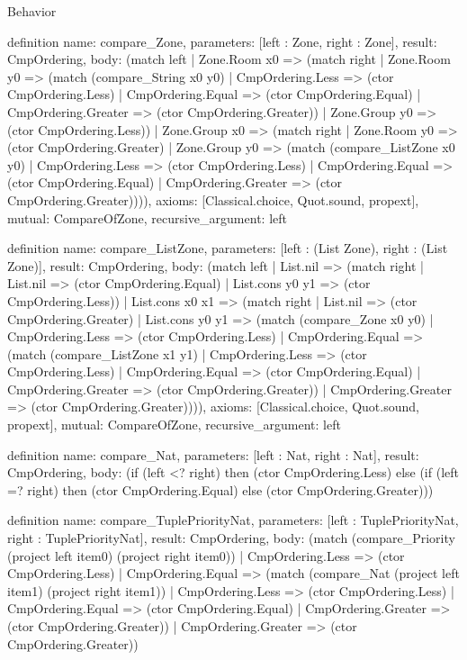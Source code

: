 \begin{lexlean}{Behavior}
\begin{semanticmodule}
definition{
  name: compare_Zone,
  parameters: [left : Zone, right : Zone],
  result: CmpOrdering,
  body: (match left
    | Zone.Room x0 => (match right
      | Zone.Room y0 => (match (compare_String x0 y0)
        | CmpOrdering.Less => (ctor CmpOrdering.Less)
        | CmpOrdering.Equal => (ctor CmpOrdering.Equal)
        | CmpOrdering.Greater => (ctor CmpOrdering.Greater))
      | Zone.Group y0 => (ctor CmpOrdering.Less))
    | Zone.Group x0 => (match right
      | Zone.Room y0 => (ctor CmpOrdering.Greater)
      | Zone.Group y0 => (match (compare_ListZone x0 y0)
        | CmpOrdering.Less => (ctor CmpOrdering.Less)
        | CmpOrdering.Equal => (ctor CmpOrdering.Equal)
        | CmpOrdering.Greater => (ctor CmpOrdering.Greater)))),
  axioms: [Classical.choice, Quot.sound, propext],
  mutual: CompareOfZone,
  recursive_argument: left
}

definition{
  name: compare_ListZone,
  parameters: [left : (List Zone), right : (List Zone)],
  result: CmpOrdering,
  body: (match left
    | List.nil => (match right
      | List.nil => (ctor CmpOrdering.Equal)
      | List.cons y0 y1 => (ctor CmpOrdering.Less))
    | List.cons x0 x1 => (match right
      | List.nil => (ctor CmpOrdering.Greater)
      | List.cons y0 y1 => (match (compare_Zone x0 y0)
        | CmpOrdering.Less => (ctor CmpOrdering.Less)
        | CmpOrdering.Equal => (match (compare_ListZone x1 y1)
          | CmpOrdering.Less => (ctor CmpOrdering.Less)
          | CmpOrdering.Equal => (ctor CmpOrdering.Equal)
          | CmpOrdering.Greater => (ctor CmpOrdering.Greater))
        | CmpOrdering.Greater => (ctor CmpOrdering.Greater)))),
  axioms: [Classical.choice, Quot.sound, propext],
  mutual: CompareOfZone,
  recursive_argument: left
}

definition{
  name: compare_Nat,
  parameters: [left : Nat, right : Nat],
  result: CmpOrdering,
  body: (if (left <? right) then (ctor CmpOrdering.Less) else (if (left =? right) then (ctor CmpOrdering.Equal) else (ctor CmpOrdering.Greater)))
}

definition{
  name: compare_TuplePriorityNat,
  parameters: [left : TuplePriorityNat, right : TuplePriorityNat],
  result: CmpOrdering,
  body: (match (compare_Priority (project left item0) (project right item0))
    | CmpOrdering.Less => (ctor CmpOrdering.Less)
    | CmpOrdering.Equal => (match (compare_Nat (project left item1) (project right item1))
      | CmpOrdering.Less => (ctor CmpOrdering.Less)
      | CmpOrdering.Equal => (ctor CmpOrdering.Equal)
      | CmpOrdering.Greater => (ctor CmpOrdering.Greater))
    | CmpOrdering.Greater => (ctor CmpOrdering.Greater))
}


\end{semanticmodule}
\end{lexlean}
